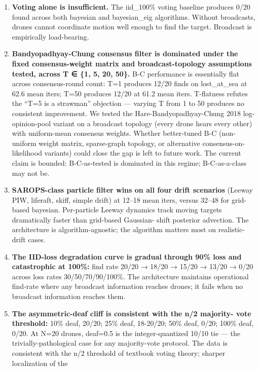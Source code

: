 \begin{enumerate}
\def\labelenumi{\arabic{enumi}.}
\item
  \textbf{Voting alone is insufficient.} The iid\_100\% voting baseline
  produces 0/20 found across both bayesian and bayesian\_eig algorithms.
  Without broadcasts, drones cannot coordinate motion well enough to
  find the target. Broadcast is empirically load-bearing.
\item
  \textbf{Bandyopadhyay-Chung consensus filter is dominated under the
  fixed consensus-weight matrix and broadcast-topology assumptions
  tested, across T ∈ \{1, 5, 20, 50\}.} B-C performance is essentially
  flat across consensus-round count: T=1 produces 12/20 finds on
  lost\_at\_sea at 62.6 mean iters; T=50 produces 12/20 at 61.2 mean
  iters. T-flatness refutes the ``T=5 is a strawman'' objection ---
  varying T from 1 to 50 produces no consistent improvement. We tested
  the Hare-Bandyopadhyay-Chung 2018 log-opinion-pool variant on a
  broadcast topology (every drone hears every other) with uniform-mean
  consensus weights. Whether better-tuned B-C (non-uniform weight
  matrix, sparse-graph topology, or alternative consensus-on-likelihood
  variants) could close the gap is left to future work. The current
  claim is bounded: B-C-as-tested is dominated in this regime;
  B-C-as-a-class may not be.
\item
  \textbf{SAROPS-class particle filter wins on all four drift scenarios}
  (Leeway PIW, liferaft, skiff, simple drift) at 12--18 mean iters,
  versus 32--48 for grid-based bayesian. Per-particle Leeway dynamics
  track moving targets dramatically faster than grid-based Gaussian-
  shift posterior advection. The architecture is algorithm-agnostic; the
  algorithm matters most on realistic-drift cases.
\item
  \textbf{The IID-loss degradation curve is gradual through 90\% loss
  and catastrophic at 100\%:} find rate 20/20 → 18/20 → 15/20 → 13/20 →
  0/20 across loss rates 30/50/70/90/100\%. The architecture maintains
  operational find-rate where any broadcast information reaches drones;
  it fails when no broadcast information reaches them.
\item
  \textbf{The asymmetric-deaf cliff is consistent with the n/2 majority-
  vote threshold:} 10\% deaf, 20/20; 25\% deaf, 18-20/20; 50\% deaf,
  0/20; 100\% deaf, 0/20. At N=20 drones, deaf=0.5 is the
  integer-quantized 10/10 tie --- the trivially-pathological case for
  any majority-vote protocol. The data is consistent with the n/2
  threshold of textbook voting theory; sharper localization of the

\end{enumerate}
